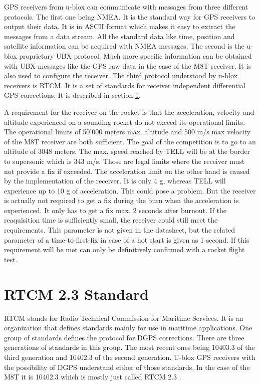 GPS receivers from u-blox can communicate with messages from three different protocols.
The first one being NMEA.
It is the standard way for GPS receivers to output their data.
It is in ASCII format which makes it easy to extract the messages from a data stream.
All the standard data like time, position and satellite information can be acquired with NMEA messages.
The second is the u-blox proprietary UBX protocol.
Much more specific information can be obtained with UBX messages like the GPS raw data in the case of the M8T receiver.
It is also used to configure the receiver.
The third protocol understood by u-blox receivers is RTCM.
It is a set of standards for receiver independent differential GPS corrections.
It is described in section \ref{sec:rtcm}.

A requirement for the receiver on the rocket is that the acceleration, velocity and altitude experienced on a sounding rocket do not exceed its operational limits.
The operational limits of 50'000 meters max. altitude and 500 m/s max velocity of the M8T receiver are both sufficient.
The goal of the competition is to go to an altitude of 3048 meters.
The max. speed reached by TELL will be at the border to supersonic which is 343 m/s.
Those are legal limits where the receiver must not provide a fix if exceeded.
The acceleration limit on the other hand is caused by the implementation of the receiver.
It is only 4 g, whereas TELL will experience up to 10 g of acceleration.
This could pose a problem.
But the receiver is actually not required to get a fix during the burn when the acceleration is experienced.
It only has to get a fix max. 2 seconds after burnout.
If the reaquisition time is sufficiently small, the receiver could still meet the requirements.
This parameter is not given in the datasheet, but the related parameter of a time-to-first-fix in case of a hot start is given as 1 second.
If this requirement will be met can only be definitively confirmed with a rocket flight test. \cite{M8T}


\section{RTCM 2.3 Standard}\label{sec:rtcm}

RTCM stands for Radio Technical Commission for Maritime Services.
It is an organization that defines standards mainly for use in maritime applications.
One group of standards defines the protocol for DGPS corrections.
There are three generations of standards in this group.
The most recent ones being 10403.3 of the third generation and 10402.3 of the second generation.
U-blox GPS receivers with the possibility of DGPS understand either of those standards.
In the case of the M8T it is 10402.3 which is mostly just called RTCM 2.3 \cite{RTCM_2.3}.

